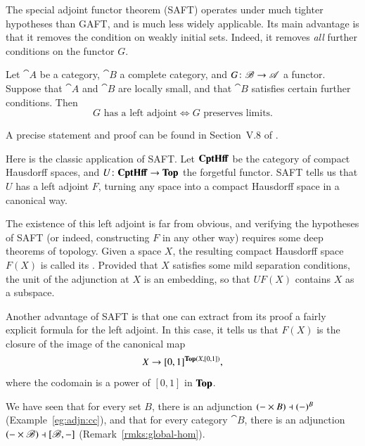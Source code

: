 The special adjoint functor theorem (SAFT) operates under much tighter
hypotheses than GAFT, and is much less widely applicable.  Its main
advantage is that it removes the condition on weakly initial sets.  Indeed,
it removes \emph{all} further conditions on the functor $G$.

\begin{thm}
%
%
%
%
Let $\cat{A}$ be a category, $\cat{B}$ a complete category, and $G\from
\cat{B} \to \cat{A}$ a functor.  Suppose that $\cat{A}$ and $\cat{B}$ are
locally small, and that $\cat{B}$ satisfies certain further conditions.  Then
\[
G \text{ has a left adjoint}
\iff
G \text{ preserves limits}.
\]
\end{thm}
%
A precise statement and proof can be found in Section~V.8 of \citeCWM.

\begin{example}
Here is the classic application of SAFT.  Let $\mathbf{CptHff}$%
%
%
be the category of compact Hausdorff spaces, and $U\from \CptHff \to \Tp$
the forgetful functor.  SAFT tells us that $U$ has a left adjoint $F$,
turning any space into a compact Hausdorff space in a canonical way.

The existence of this left adjoint is far from obvious, and verifying the
hypotheses of SAFT (or indeed, constructing $F$ in any other way) requires
some deep theorems of topology.  Given a space $X$, the resulting compact
Hausdorff space $F(X)$ is called its .  Provided that $X$ satisfies some mild separation
conditions, the unit of the adjunction at $X$ is an embedding, so that
$UF(X)$ contains $X$ as a subspace.

Another advantage of SAFT is that one can extract from its proof a fairly
explicit formula for the left adjoint.  In this case, it tells us that
$F(X)$ is the closure of the image of the canonical map
\[
X \to [0, 1]^{\mathbf{Top}(X, [0, 1])},
\]
where the codomain is a power of $[0, 1]$ in $\mathbf{Top}$.
%
%
\end{example}


%
%
%

We have seen that for every set $B$, there is an adjunction $(-\times B)
\dashv (-)^B$ (Example~\ref{eg:adjn:cc}), and that for every category
$\cat{B}$, there is an adjunction $(- \times \mathscr{B}) \dashv
[\mathscr{B},-]$
(Remark~\ref{rmks:global-hom}).

